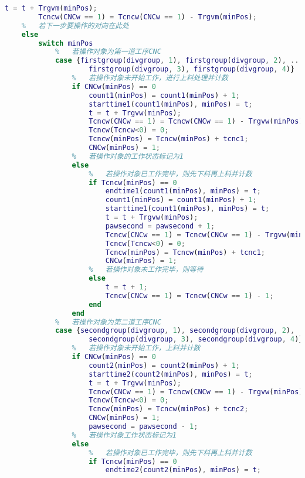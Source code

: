 \documentclass[no-math,withoutpreface,bwprint]{cumcmthesis} %
\numberwithin{equation}{section}
\numberwithin{figure}{section}
\numberwithin{table}{section}
\begin{document}
\begin{lstlisting}[language=matlab]
        t = t + Trgvm(minPos);
        Tcncw(CNCw == 1) = Tcncw(CNCw == 1) - Trgvm(minPos);
    %   若下一步要操作的对向在此处
    else
        switch minPos
            %   若操作对象为第一道工序CNC
            case {firstgroup(divgroup, 1), firstgroup(divgroup, 2), ...
                    firstgroup(divgroup, 3), firstgroup(divgroup, 4)}
                %   若操作对象未开始工作，进行上料处理并计数
                if CNCw(minPos) == 0
                    count1(minPos) = count1(minPos) + 1;
                    starttime1(count1(minPos), minPos) = t;
                    t = t + Trgvw(minPos);
                    Tcncw(CNCw == 1) = Tcncw(CNCw == 1) - Trgvw(minPos);
                    Tcncw(Tcncw<0) = 0;
                    Tcncw(minPos) = Tcncw(minPos) + tcnc1;
                    CNCw(minPos) = 1;
                %   若操作对象的工作状态标记为1
                else
                    %   若操作对象已工作完毕，则先下料再上料并计数
                    if Tcncw(minPos) == 0
                        endtime1(count1(minPos), minPos) = t;
                        count1(minPos) = count1(minPos) + 1;
                        starttime1(count1(minPos), minPos) = t;
                        t = t + Trgvw(minPos);
                        pawsecond = pawsecond + 1;
                        Tcncw(CNCw == 1) = Tcncw(CNCw == 1) - Trgvw(minPos);
                        Tcncw(Tcncw<0) = 0;
                        Tcncw(minPos) = Tcncw(minPos) + tcnc1;
                        CNCw(minPos) = 1;
                    %   若操作对象未工作完毕，则等待
                    else
                        t = t + 1;
                        Tcncw(CNCw == 1) = Tcncw(CNCw == 1) - 1;
                    end
                end
            %   若操作对象为第二道工序CNC
            case {secondgroup(divgroup, 1), secondgroup(divgroup, 2), ...
                    secondgroup(divgroup, 3), secondgroup(divgroup, 4)}
                %   若操作对象未开始工作，上料并计数
                if CNCw(minPos) == 0
                    count2(minPos) = count2(minPos) + 1;
                    starttime2(count2(minPos), minPos) = t;
                    t = t + Trgvw(minPos);
                    Tcncw(CNCw == 1) = Tcncw(CNCw == 1) - Trgvw(minPos);
                    Tcncw(Tcncw<0) = 0;
                    Tcncw(minPos) = Tcncw(minPos) + tcnc2;
                    CNCw(minPos) = 1;
                    pawsecond = pawsecond - 1;
                %   若操作对象工作状态标记为1
                else
                    %   若操作对象已工作完毕，则先下料再上料并计数
                    if Tcncw(minPos) == 0
                        endtime2(count2(minPos), minPos) = t;

\end{lstlisting}
\end{document}
